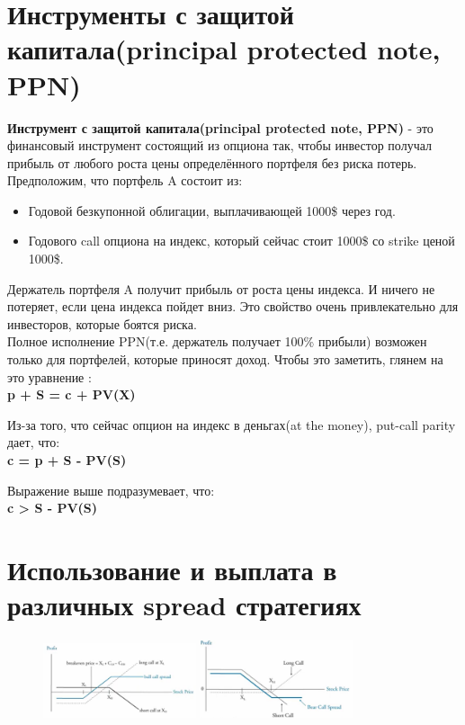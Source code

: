 \documentclass{article}
\begin{document}
 \newpage
 \section{Инструменты с защитой капитала(principal protected note, PPN)}
 \textbf{Инструмент с защитой капитала(principal protected note, PPN)} - это финансовый инструмент состоящий из опциона так, чтобы инвестор получал прибыль от любого роста цены определённого портфеля без риска потерь.\\
 Предположим, что портфель A состоит из:
 \begin{itemize}
 \item Годовой безкупонной облигации, выплачивающей 1000\$ через год.
 
 \item Годового call опциона на индекс, который сейчас стоит 1000\$ со strike ценой 1000\$.
 
 \end{itemize}

  \raggedright Держатель портфеля A получит прибыль от роста цены индекса. И ничего не потеряет, если цена индекса пойдет вниз. Это свойство очень привлекательно для инвесторов, которые боятся риска.\\
 Полное исполнение PPN(т.е. держатель получает 100\% прибыли) возможен только для портфелей, которые приносят доход.
 Чтобы это заметить, глянем на это уравнение :\\
 \centering \textbf{p + S = c + PV(X)}\\
 \raggedright Из-за того, что сейчас опцион на индекс в деньгах(at the money), put-call parity дает, что:\\
 \centering \textbf{c = p + S - PV(S)}\\
 \raggedright Выражение выше подразумевает, что: \\
 \centering \textbf{c > S - PV(S)}\\
 \raggedright
 
 
 \section{Использование и выплата в различных spread стратегиях}
 
 
\begin{figure}
    \centering    \includegraphics[width=0.4\textwidth]{bull call spread.png}
    \centering    \includegraphics[width=0.4\textwidth]{bear call spread.png}
\end{figure}
\end{document}
